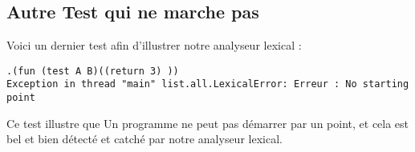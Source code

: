 \subsection{Autre Test qui ne marche pas}

Voici un dernier test afin d'illustrer notre analyseur lexical : 

\begin{verbatim}
.(fun (test A B)((return 3) ))
Exception in thread "main" list.all.LexicalError: Erreur : No starting point
\end{verbatim}

Ce test illustre que Un programme ne peut pas démarrer par un point, et cela est bel et bien détecté et catché par notre analyseur lexical.



